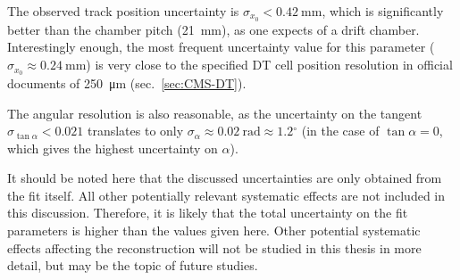 \par The observed track position uncertainty is $\sigma_{x_0}<\SI{0.42}{\milli\meter}$, which is significantly better than the chamber pitch (\SI{21}{\mm}), as one expects of a drift chamber. Interestingly enough, the most frequent uncertainty value for this parameter ($\sigma_{x_0}\approx\SI{0.24}{\milli\meter}$) is very close to the specified \ac{DT} cell position resolution in official documents of \SI{250}{\micro\meter} \cite{CMS-Main} (sec.\ \ref{sec:CMS-DT}).
\par The angular resolution is also reasonable, as the uncertainty on the tangent $\sigma_{\tan\alpha}<0.021$ translates to only $\sigma_\alpha \approx \SI{0.02}{\radian} \approx 1.2{}^\circ$ (in the case of $\tan\alpha=0$, which gives the highest uncertainty on $\alpha$).
\par It should be noted here that the discussed uncertainties are only obtained from the fit itself. All other potentially relevant systematic effects are not included in this discussion. Therefore, it is likely that the total uncertainty on the fit parameters is higher than the values given here. Other potential systematic effects affecting the reconstruction will not be studied in this thesis in more detail, but may be the topic of future studies.
